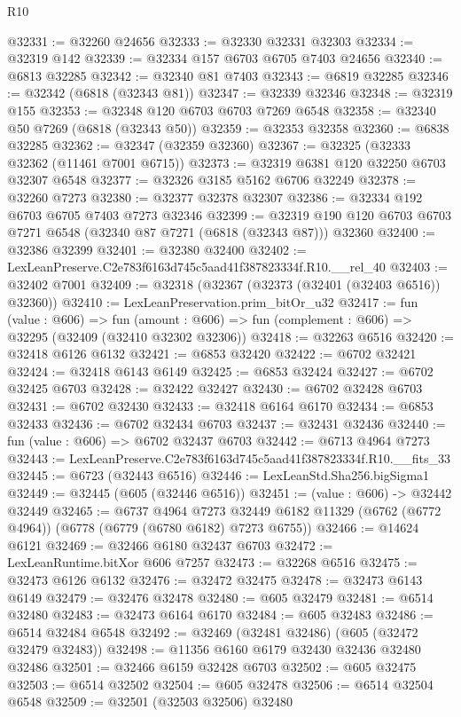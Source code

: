 \begin{lexlean}{R10}
\begin{coremodule}
@32331 := @32260 @24656
@32333 := @32330 @32331 @32303
@32334 := @32319 @142
@32339 := @32334 @157 @6703 @6705 @7403 @24656
@32340 := @6813 @32285
@32342 := @32340 @81 @7403
@32343 := @6819 @32285
@32346 := @32342 (@6818 (@32343 @81))
@32347 := @32339 @32346
@32348 := @32319 @155
@32353 := @32348 @120 @6703 @6703 @7269 @6548
@32358 := @32340 @50 @7269 (@6818 (@32343 @50))
@32359 := @32353 @32358
@32360 := @6838 @32285
@32362 := @32347 (@32359 @32360)
@32367 := @32325 (@32333 @32362 (@11461 @7001 @6715))
@32373 := @32319 @6381 @120 @32250 @6703 @32307 @6548
@32377 := @32326 @3185 @5162 @6706 @32249
@32378 := @32260 @7273
@32380 := @32377 @32378 @32307
@32386 := @32334 @192 @6703 @6705 @7403 @7273 @32346
@32399 := @32319 @190 @120 @6703 @6703 @7271 @6548 (@32340 @87 @7271 (@6818 (@32343 @87))) @32360
@32400 := @32386 @32399
@32401 := @32380 @32400
@32402 := LexLeanPreserve.C2e783f6163d745c5aad41f387823334f.R10.__rel_40
@32403 := @32402 @7001
@32409 := @32318 (@32367 (@32373 (@32401 (@32403 @6516)) @32360))
@32410 := LexLeanPreservation.prim_bitOr_u32
@32417 := fun (value : @606) =>
  fun (amount : @606) => fun (complement : @606) => @32295 (@32409 (@32410 @32302 @32306))
@32418 := @32263 @6516
@32420 := @32418 @6126 @6132
@32421 := @6853 @32420
@32422 := @6702 @32421
@32424 := @32418 @6143 @6149
@32425 := @6853 @32424
@32427 := @6702 @32425 @6703
@32428 := @32422 @32427
@32430 := @6702 @32428 @6703
@32431 := @6702 @32430
@32433 := @32418 @6164 @6170
@32434 := @6853 @32433
@32436 := @6702 @32434 @6703
@32437 := @32431 @32436
@32440 := fun (value : @606) => @6702 @32437 @6703
@32442 := @6713 @4964 @7273
@32443 := LexLeanPreserve.C2e783f6163d745c5aad41f387823334f.R10.__fits_33
@32445 := @6723 (@32443 @6516)
@32446 := LexLeanStd.Sha256.bigSigma1
@32449 := @32445 (@605 (@32446 @6516))
@32451 := (value : @606) -> @32442 @32449
@32465 := @6737
    @4964
    @7273
    @32449
    @6182
    @11329
    (@6762 (@6772 @4964))
    (@6778 (@6779 (@6780 @6182) @7273 @6755))
@32466 := @14624 @6121
@32469 := @32466 @6180 @32437 @6703
@32472 := LexLeanRuntime.bitXor @606 @7257
@32473 := @32268 @6516
@32475 := @32473 @6126 @6132
@32476 := @32472 @32475
@32478 := @32473 @6143 @6149
@32479 := @32476 @32478
@32480 := @605 @32479
@32481 := @6514 @32480
@32483 := @32473 @6164 @6170
@32484 := @605 @32483
@32486 := @6514 @32484 @6548
@32492 := @32469 (@32481 @32486) (@605 (@32472 @32479 @32483))
@32498 := @11356 @6160 @6179 @32430 @32436 @32480 @32486
@32501 := @32466 @6159 @32428 @6703
@32502 := @605 @32475
@32503 := @6514 @32502
@32504 := @605 @32478
@32506 := @6514 @32504 @6548
@32509 := @32501 (@32503 @32506) @32480

\end{coremodule}
\end{lexlean}
